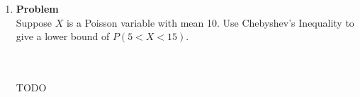\documentclass[12pt]{article}
\newenvironment{Ex}{\textbf{Problem}\vspace{.75em}\\}{}
\begin{document}
\begin{enumerate}
\begin{Ex}
\begin{solution}
\begin{enumerate}
        described as the following.
        \begin{equation}
          \label{eq:5c-presol}
          f_{U|V}(u|V=5) \sim N(\mu_{U|V}(v), \sigma_{U|V}(v))
        \end{equation}
        First we must find $\mu_{U|V}$
        \begin{equation}
          \label{eq:5c-mu-v}
          \begin{aligned}
            \mu_{U|V}(v) &= \mu_V + \rho_{U,V}
            \frac{\sigma_U}{\sigma_V}(v-mu_v) \\
            &= 1 + \frac{1+2\alpha}{\sqrt{3+6\alpha^2}}
            \frac{\sqrt{3}}{\sqrt{1+2\alpha^2}}(5-\alpha)\\
            \implies \mu_{U|V}(v) &= 1 + \frac{1 + 2\alpha}{1 +
              2\alpha^2}(5-\alpha) \\
          \end{aligned}
        \end{equation}
      \end{enumerate}
      And the variance $\sigma_{U|V}^2$
      \begin{equation}
        \label{eq:5c-sigma}
        \begin{aligned}
          \sigma_{U|V}^2 &= \sigma_U^2(1-\rho_{U,V}^2) \\
          &= 3\left(1 -
            \left(\frac{1+2\alpha}{\sqrt{3+6\alpha^2}}\right)\right) \\
          &= 3\left(1- \frac{(1+2\alpha)^2}{3+6\alpha}\right) \\
          \implies \sigma_{U|V}^2 &= 3 - \frac{(1+2\alpha^2)}{1 +
            2\alpha^2} \\
        \end{aligned}
      \end{equation}
      Putting this all into \cref{eq:5c-presol} obtains
      \\\\ {\color{red} \huge FINISH THIS}
    \end{solution}
  \end{Ex}
\item
  \begin{Ex}
    Suppose $X$ is a Poisson variable with mean 10. Use Chebyshev's
    Inequality to give a lower bound of $P(5 < X < 15)$.
    \begin{solution} \hfill
      \\\\ {\color{red} \huge TODO}
    \end{solution}

\end{Ex}
\end{enumerate}
\end{document}
